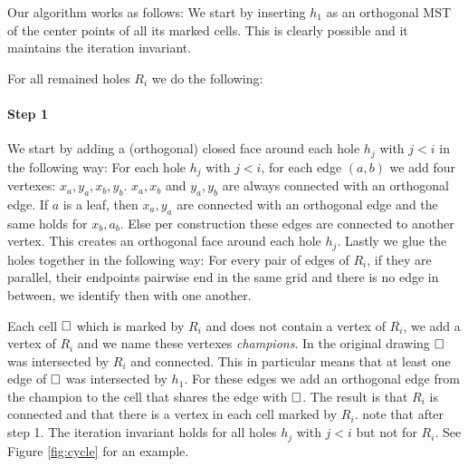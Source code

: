 \documentclass[a4paper, UKenglish]{lipics-v2018}
\newcommand{\pix}{\square}
\begin{document}
Our algorithm works as follows: We start by inserting $h_1$ as an orthogonal MST of the center points of all its marked cells. This is clearly possible and it maintains the iteration invariant.



For all remained holes $R_i$ we do the following:

\paragraph*{Step 1}
We start by adding a (orthogonal) closed face around each hole $h_j$ with $j < i$ in the following way:
For each hole $h_j$ with $j < i$, for each edge $(a,b)$ we add four vertexes: $x_a, y_a, x_b, y_b$.  $x_a, x_b$ and $y_a,y_b$ are always connected with an orthogonal edge. If $a$ is a leaf, then $x_a,y_a$ are connected with an orthogonal edge and the same holds for $x_b,a_b$. Else per construction these edges are connected to another vertex. This creates an orthogonal face around each hole $h_j$.
Lastly we glue the holes together in the following way: For every pair of edges of $R_i$, if they are parallel, their endpoints pairwise end in the same grid and there is no edge in between, we identify then with one another. 

Each cell $\hfill\pix$ which is marked by $R_i$ and does not contain a vertex of $R_i$, we add a vertex of $R_i$ and we name these vertexes \emph{champions}. In the original drawing $\hfill\pix$ was intersected by $R_i$ and connected. This in particular means that at least one edge of $\hfill\pix$ was intersected by $h_1$. For these edges we add an orthogonal edge from the champion to the cell that shares the edge with $\hfill\pix$. The result is that $R_i$ is connected and that there is a vertex in each cell marked by $R_i$.
note that after step 1. The iteration invariant holds for all holes $h_j$ with $j < i$ but not for $R_i$. See Figure \ref{fig:cycle} for an example.
\end{document}
